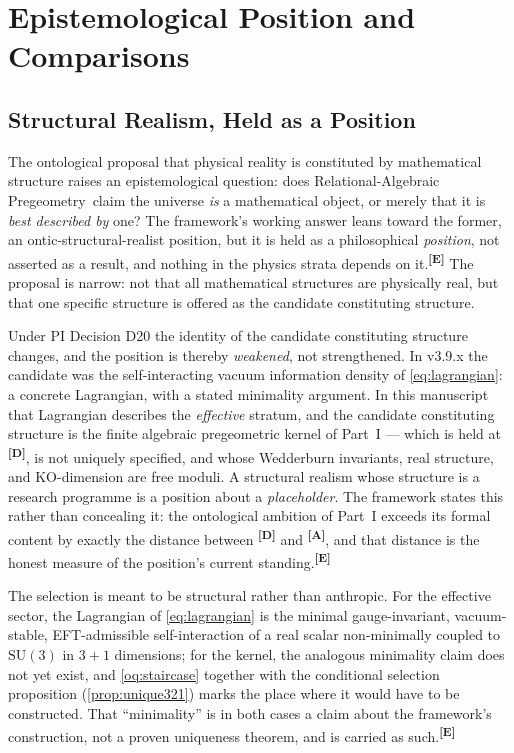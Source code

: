 \documentclass[12pt,a4paper,twoside]{article}
\theoremstyle{plain}
\theoremstyle{definition}
\theoremstyle{remark}
\newcommand{\ProjectShort}{Relational-Algebraic Pregeometry}
\newcommand{\RAP}{\ProjectShort}
\newcommand{\catmark}[1]{\textsuperscript{\textsf{\textbf{[#1]}}}}
\begin{document}
\section{Epistemological Position and Comparisons}
\label{sec:epistemology}

\subsection{Structural Realism, Held as a Position}
\label{subsec:structural-realism}

The ontological proposal that physical reality is constituted by
mathematical structure raises an epistemological question: does \RAP\
claim the universe \emph{is} a mathematical object, or merely that it is
\emph{best described by} one? The framework's working answer leans toward
the former, an ontic-structural-realist position, but it is held as a
philosophical \emph{position}, not asserted as a result, and nothing in
the physics strata depends on it.\catmark{E} The proposal is narrow: not
that all mathematical structures are physically real, but that one
specific structure is offered as the candidate constituting structure.

\begin{governancebox}[What D20 Does to the Structural-Realist Position]
Under PI Decision D20 the identity of the candidate constituting
structure changes, and the position is thereby \emph{weakened}, not
strengthened. In v3.9.x the candidate was the self-interacting vacuum
information density of \cref{eq:lagrangian}: a concrete Lagrangian, with
a stated minimality argument. In this manuscript that Lagrangian describes the
\emph{effective} stratum, and the candidate constituting structure is the
finite algebraic pregeometric kernel of Part~I --- which is held at
\catmark{D}, is not uniquely specified, and whose Wedderburn invariants,
real structure, and KO-dimension are free moduli. A structural realism
whose structure is a research programme is a position about a
\emph{placeholder}. The framework states this rather than concealing it:
the ontological ambition of Part~I exceeds its formal content by exactly
the distance between \catmark{D} and \catmark{A}, and that distance is
the honest measure of the position's current standing.\catmark{E}
\end{governancebox}

\noindent The selection is meant to be structural rather than anthropic.
For the effective sector, the Lagrangian of \cref{eq:lagrangian} is the
minimal gauge-invariant, vacuum-stable, EFT-admissible self-interaction
of a real scalar non-minimally coupled to $\mathrm{SU}(3)$ in $3+1$
dimensions; for the kernel, the analogous minimality claim does not yet
exist, and \cref{oq:staircase} together with the conditional selection
proposition (\cref{prop:unique321}) marks the place where it would have
to be constructed. That ``minimality'' is in both cases a claim about the
framework's construction, not a proven uniqueness theorem, and is carried
as such.\catmark{E}
\end{document}
